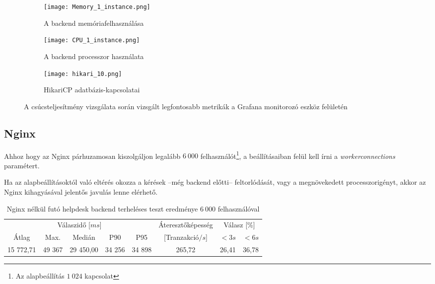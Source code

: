 \begin{figure}[hbt]
	\begin{subfigure}{.95\textwidth}
		\centering
		\texttt{[image: Memory\_1\_instance.png]}  
		\caption{A backend memóriafelhasználása}
		\label{fig:memory_1_instance}

	\end{subfigure}
	\quad

	\begin{subfigure}{.6\textwidth}
		\centering
		\texttt{[image: CPU\_1\_instance.png]}  
		\caption{A backend processzor használata}
		\label{fig:cpu_1_instance}
	\end{subfigure}

	\quad
	\begin{subfigure}{.8\textwidth}
		\centering
		\texttt{[image: hikari\_10.png]}  
		\caption{HikariCP adatbázis-kapcsolatai}
		\label{fig:10_hikari}
	\end{subfigure}
	
	\caption{A csúcsteljesítmény vizsgálata során vizsgált legfontosabb metrikák a Grafana monitorozó eszköz felületén}
	\label{fig:peak_metrics}
\end{figure}

\pagebreak

\subsection{Nginx}
Ahhoz hogy az Nginx párhuzamosan kiszolgáljon legalább $6~000$ felhasználót\footnote{Az alapbeállítás $1~024$ kapcsolat}, a beállításaiban felül kell írni a \mbox{\textit{worker\textunderscore connections}} paramétert.

Ha az alapbeállításoktól való eltérés okozza a kérések --még backend előtti-- feltorlódását, vagy a megnövekedett processzorigényt, akkor az Nginx kihagyásával jelentős javulás lenne elérhető.

\bigskip
\begin{table}[hbt]
	
	\begin{tabular}{ccccc|c|cc}
		\multicolumn{5}{c|}{Válaszidő [$ms$]}  & Áteresztőképesség & \multicolumn{2}{c}{Válasz [\%]}	\\
		Átlag & Max. & Medián & P90 & P95 &	[Tranzakció$/s$] & $<3s$& $<6s$ \\
		\hline 
		15 772,71 &  49 367 & 29 450,00 & 34 256 & 34 898 & 265,72 & 26,41 & 36,78 \\
	\end{tabular} 
	
	\caption{Nginx nélkül futó helpdesk backend terheléses teszt eredménye $6~000$ felhasználóval}
	\label{tabl:without_nginx}
\end{table}

